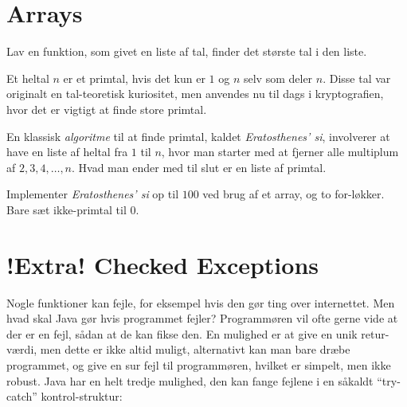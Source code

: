 
\section{Arrays}



	\begin{exercise}
		Lav en funktion, som givet en liste af tal, finder det største tal i den
		liste.
	\end{exercise}

	\begin{exercise}
		Et heltal \(n\) er et primtal, hvis det kun er \(1\) og \(n\) selv som
		deler \(n\). Disse tal var originalt en tal-teoretisk kuriositet, men
		anvendes nu til dags i kryptografien, hvor det er vigtigt at finde store
		primtal.

		En klassisk \emph{algoritme} til at finde primtal, kaldet
		\emph{Eratosthenes' si}, involverer at have en liste af heltal fra \(1\)
		til \(n\), hvor man starter med at fjerner alle multiplum af
		\(2, 3, 4, \dots, n\). Hvad man ender med til slut er en liste af primtal.

		Implementer \emph{Eratosthenes' si} op til \(100\) ved brug af et
		array, og to for-løkker. Bare sæt ikke-primtal til \(0\).
	\end{exercise}

\section{!Extra! Checked Exceptions}

	Nogle funktioner kan fejle, for eksempel hvis den gør ting over internettet.
	Men hvad skal Java gør hvis programmet fejler? Programmøren vil ofte gerne
	vide at der er en fejl, sådan at de kan fikse den. En mulighed er at give en
	unik retur-værdi, men dette er ikke altid muligt, alternativt kan man bare
	dræbe programmet, og give en sur fejl til programmøren, hvilket er simpelt,
	men ikke robust. Java har en helt tredje mulighed, den kan fange fejlene i
	en såkaldt ``try-catch'' kontrol-struktur:

